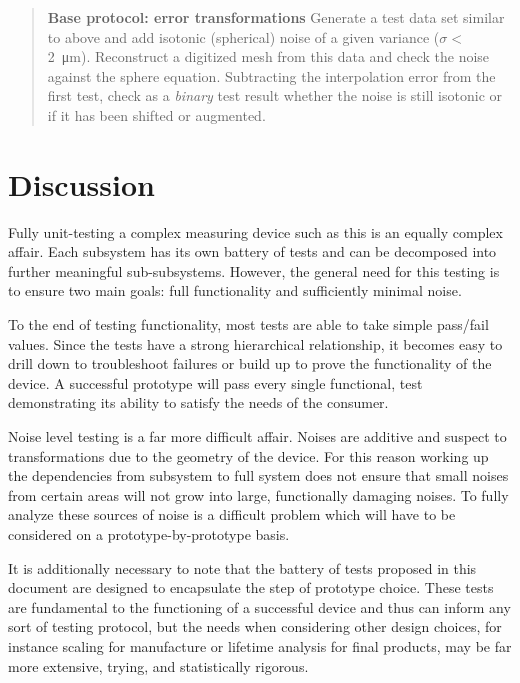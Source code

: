 \documentclass{article}
\begin{document}
\begin{quotation}
  \textbf{Base protocol: error transformations} Generate a test data   set similar to above and add isotonic (spherical) noise of a given   variance ($\sigma <$ \SI{2}{\micro m}). Reconstruct a digitized mesh   from this data and check the noise against the sphere equation.   Subtracting the interpolation error from the first test, check as a   \textit{binary} test result whether the noise is still isotonic or   if it has been shifted or augmented.
\end{quotation}

\section{Discussion}
\label{sec:discussion}

Fully unit-testing a complex measuring device such as this is an equally complex affair. Each subsystem has its own battery of tests and can be decomposed into further meaningful sub-subsystems. However, the general need for this testing is to ensure two main goals: full functionality and sufficiently minimal noise.

To the end of testing functionality, most tests are able to take simple pass/fail values. Since the tests have a strong hierarchical relationship, it becomes easy to drill down to troubleshoot failures or build up to prove the functionality of the device. A successful prototype will pass every single functional, test demonstrating its ability to satisfy the needs of the consumer.

Noise level testing is a far more difficult affair. Noises are additive and suspect to transformations due to the geometry of the device. For this reason working up the dependencies from subsystem to full system does not ensure that small noises from certain areas will not grow into large, functionally damaging noises. To fully analyze these sources of noise is a difficult problem which will have to be considered on a prototype-by-prototype basis.

It is additionally necessary to note that the battery of tests proposed in this document are designed to encapsulate the step of prototype choice. These tests are fundamental to the functioning of a successful device and thus can inform any sort of testing protocol, but the needs when considering other design choices, for instance scaling for manufacture or lifetime analysis for final products, may be far more extensive, trying, and statistically rigorous.
\end{document}

